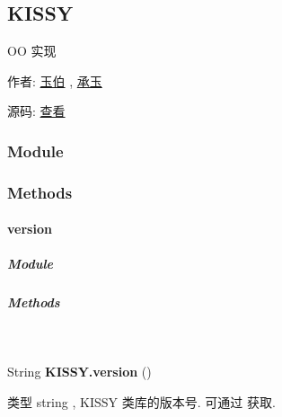 \documentclass[letterpaper,10pt,english]{sphinxmanual}
\begin{document}
\subsection{KISSY}
\label{api/seed/kissy/index:kissy}\label{api/seed/kissy/index::doc}\label{api/seed/kissy/index:id1}
\begin{DUlineblock}{0em}
\item[] OO 实现
\item[] 作者: \href{mailto:lifesinger@gmail.com}{玉伯} , \href{mailto:yiminghe@gmail.com}{承玉}
\item[] 源码: \href{https://github.com/kissyteam/kissy/tree/master/src/seed/kissy.js}{查看}
\end{DUlineblock}


\subsubsection{Module}
\label{api/seed/kissy/index:module}\begin{quote}

{\hyperref[api/seed/kissy/index:module-Seed]{}}
\end{quote}


\subsubsection{Methods}
\label{api/seed/kissy/index:methods}

\paragraph{version}
\label{api/seed/kissy/version:version}\label{api/seed/kissy/version::doc}

\subparagraph{Module}
\label{api/seed/kissy/version:module}\begin{quote}

{\hyperref[api/seed/kissy/index:module-Seed]{}}
\end{quote}


\subparagraph{Methods}
\label{api/seed/kissy/version:methods}

\begin{fulllineitems}
\label{api/seed/kissy/version:Seed.KISSY.version}~
\begin{DUlineblock}{0em}
\item[] String \textbf{KISSY.version} ()
\item[] 类型 string , KISSY 类库的版本号. 可通过  获取.
\end{DUlineblock}

\end{fulllineitems}
\end{document}
